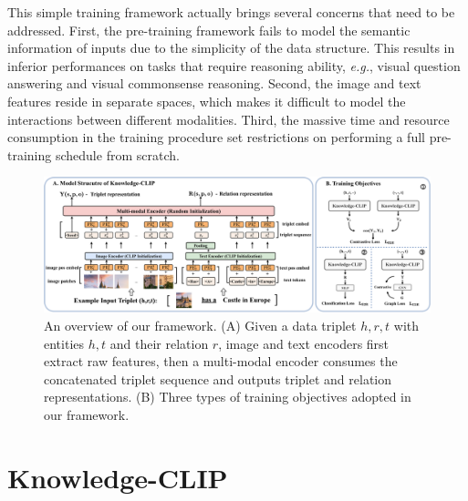 This simple training framework actually brings several concerns that need to be addressed. First, the pre-training framework fails to model the semantic information of inputs due to the simplicity of the data structure. This results in inferior performances on tasks that require reasoning ability, \textit{e.g.}, visual question answering and visual commonsense reasoning. Second, the image and text features reside in separate spaces, which makes it difficult to model the interactions between different modalities. Third, the massive time and resource consumption in the training procedure set restrictions on performing a full pre-training schedule from scratch.

\begin{figure}[t]
  \centering
  \includegraphics[width=1.0\linewidth]{3_5.pdf}
  \caption{An overview of our framework. (A) Given a data triplet $h,r,t$ with entities $h,t$ and their relation $r$, image and text encoders first extract raw features, then a multi-modal encoder consumes the concatenated triplet sequence and outputs triplet and relation representations. (B) Three types of training objectives adopted in our framework.}
\label{fig3}
\end{figure}

\section{Knowledge-CLIP}
\label{sec:method}


